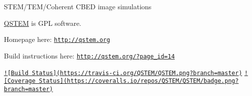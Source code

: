 S\-T\-E\-M/\-T\-E\-M/\-Coherent C\-B\-E\-D image simulations

\hyperlink{namespace_q_s_t_e_m}{Q\-S\-T\-E\-M} is G\-P\-L software.

Homepage here\-: \href{http://qstem.org}{\tt http\-://qstem.\-org}

Build instructions here\-: \href{http://qstem.org/?page_id=14}{\tt http\-://qstem.\-org/?page\-\_\-id=14}

\href{https://travis-ci.org/QSTEM/QSTEM}{\tt !\mbox{[}Build Status\mbox{]}(https\-://travis-\/ci.\-org/\-Q\-S\-T\-E\-M/\-Q\-S\-T\-E\-M.\-png?branch=master)} \href{https://coveralls.io/r/QSTEM/QSTEM?branch=master}{\tt !\mbox{[}Coverage Status\mbox{]}(https\-://coveralls.\-io/repos/\-Q\-S\-T\-E\-M/\-Q\-S\-T\-E\-M/badge.\-png?branch=master)} 